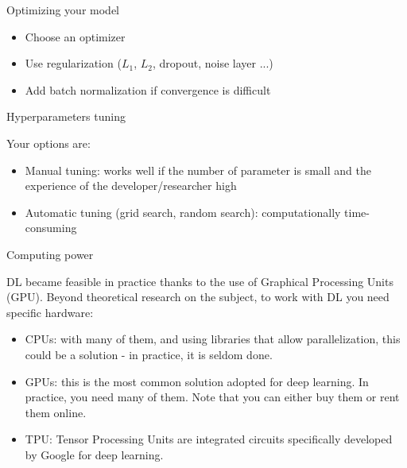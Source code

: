 \documentclass[xcolor=pdftex,dvipsnames,table,mathserif]{beamer}
\begin{document}
\begin{frame}{Optimizing your model}

  \begin{itemize}
  \item Choose an optimizer
  \item Use regularization ($L_1$, $L_2$, dropout, noise layer ...)
  \item Add batch normalization if convergence is difficult

  \end{itemize}

\end{frame}


\begin{frame}{Hyperparameters tuning}

  Your options are:

  \begin{itemize}
  \item Manual tuning: works well if the number of parameter is small and the experience of the developer/researcher high
  \item Automatic tuning (grid search, random search): computationally time-consuming
  \end{itemize}

\end{frame}

\begin{frame}{Computing power}

  DL became feasible in practice thanks to the use of Graphical Processing Units (GPU). Beyond theoretical research on the subject, to work with DL you need specific hardware:
  \begin{itemize}
  \item CPUs: with many of them, and using libraries that allow parallelization, this could be a solution - in practice, it is seldom done.
  \item GPUs: this is the most common solution adopted for deep learning. In practice, you need many of them. Note that you can either buy them or rent them online.
  \item TPU: Tensor Processing Units are integrated circuits specifically developed by Google for deep learning.
  \end{itemize}

\end{frame}
\end{document}
